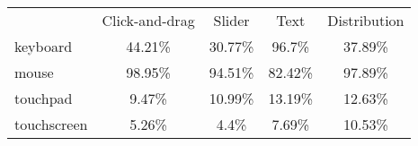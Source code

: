 
\begin{tabular}[t]{lcccc}
\toprule
\multicolumn{1}{c}{ } & \multicolumn{1}{c}{Click-and-drag} & \multicolumn{1}{c}{Slider} & \multicolumn{1}{c}{Text} & \multicolumn{1}{c}{Distribution} \\
\cmidrule(l{3pt}r{3pt}){2-2} \cmidrule(l{3pt}r{3pt}){3-3} \cmidrule(l{3pt}r{3pt}){4-4} \cmidrule(l{3pt}r{3pt}){5-5}
keyboard & 44.21\% & 30.77\% & 96.7\% & 37.89\%\\
mouse & 98.95\% & 94.51\% & 82.42\% & 97.89\%\\
touchpad & 9.47\% & 10.99\% & 13.19\% & 12.63\%\\
touchscreen & 5.26\% & 4.4\% & 7.69\% & 10.53\%\\
\bottomrule
\end{tabular}
